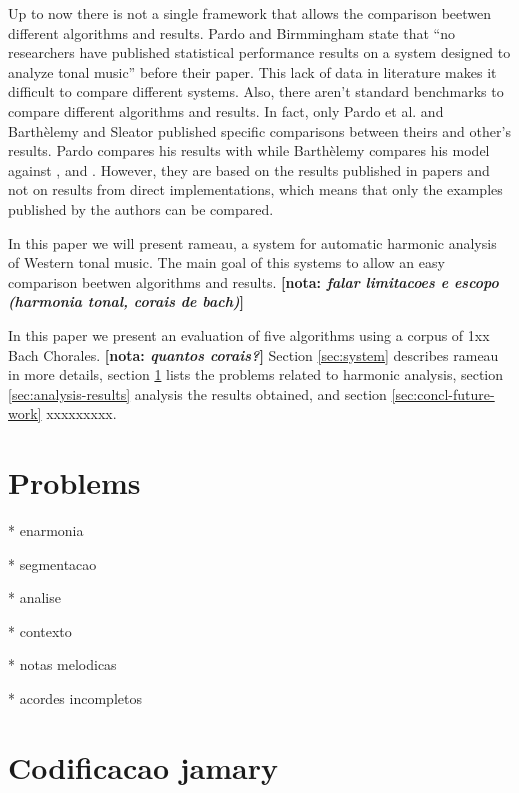\documentclass{article}
\newcommand{\nota}[1]{
  \textbf{[nota: \textit{#1}]}
}
\begin{document}

Up to now there is not a single framework that allows the comparison
beetwen different algorithms and results. Pardo and Birmmingham state
that ``no researchers have published statistical performance results
on a system designed to analyze tonal music''
\cite{pardo02:algorithms} before their paper. This lack of data in
literature makes it difficult to compare different systems. Also,
there aren't standard benchmarks to compare different algorithms and
results. In fact, only Pardo et al. \cite{pardo00:automated} and
Barthèlemy and Sleator \cite{barthelemy01:figured} published specific
comparisons between theirs and other's results. Pardo compares his
results with \cite{temperley99:modeling} while Barthèlemy compares his
model against \cite{maxwell92:expert}, \cite{pardo99:automated} and
\cite{temperley96:algorithm}. However, they are based on the results
published in papers and not on results from direct implementations,
which means that only the examples published by the authors can be
compared.

In this paper we will present rameau, a system for automatic harmonic
analysis of Western tonal music. The main goal of this systems to
allow an easy comparison beetwen algorithms and results. \nota{falar
  limitacoes e escopo (harmonia tonal, corais de bach)}

In this paper we present an evaluation of five algorithms using a
corpus of 1xx Bach Chorales. \nota{quantos corais?} Section
\ref{sec:system} describes rameau in more details, section
\ref{sec:problems} lists the problems related to harmonic analysis,
section \ref{sec:analysis-results} analysis the results obtained, and
section \ref{sec:concl-future-work} xxxxxxxxx.

\section{Problems}
\label{sec:problems}

* enarmonia

* segmentacao

* analise

* contexto

* notas melodicas

* acordes incompletos

\section{Codificacao jamary}
\label{sec:codificacao-jamary}
\end{document}
